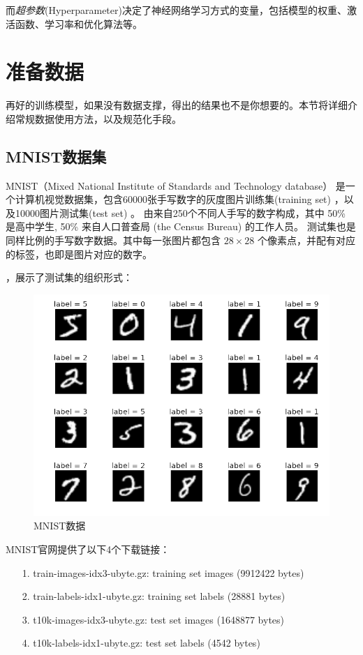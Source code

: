 而\emph{超参数}(Hyperparameter)决定了神经网络学习方式的变量，包括模型的权重、激活函数、学习率和优化算法等。



\section{准备数据}
再好的训练模型，如果没有数据支撑，得出的结果也不是你想要的。本节将详细介绍常规数据使用方法，以及规范化手段。

\subsection{MNIST数据集}
MNIST（Mixed National Institute of Standards and Technology database）
是一个计算机视觉数据集，包含60000张手写数字的灰度图片训练集(training set) ，以及10000图片测试集(test set) 。
由来自250个不同人手写的数字构成，其中 50\% 是高中学生, 50\% 来自人口普查局 (the Census Bureau) 的工作人员。
测试集也是同样比例的手写数字数据。其中每一张图片都包含 $28 \times 28$ 个像素点，并配有对应的标签，也即是图片对应的数字。
\vspace{0.6cm}

\noindent
{}，展示了测试集的组织形式：

\begin{figure}[!htb]
\centerline{\includegraphics[width=.35\figwidth]{images/MNIST-dataset.png}}
\label{fig:part3_mnist_dataset}
\caption{MNIST数据}
\end{figure}

\noindent
MNIST官网提供了以下4个下载链接：
\begin{itemize}
\item[1.] train-images-idx3-ubyte.gz:  training set images (9912422 bytes) 
\item[2.] train-labels-idx1-ubyte.gz:  training set labels (28881 bytes) 
\item[3.] t10k-images-idx3-ubyte.gz:   test set images (1648877 bytes) 
\item[4.] t10k-labels-idx1-ubyte.gz:   test set labels (4542 bytes)
\end{itemize}


